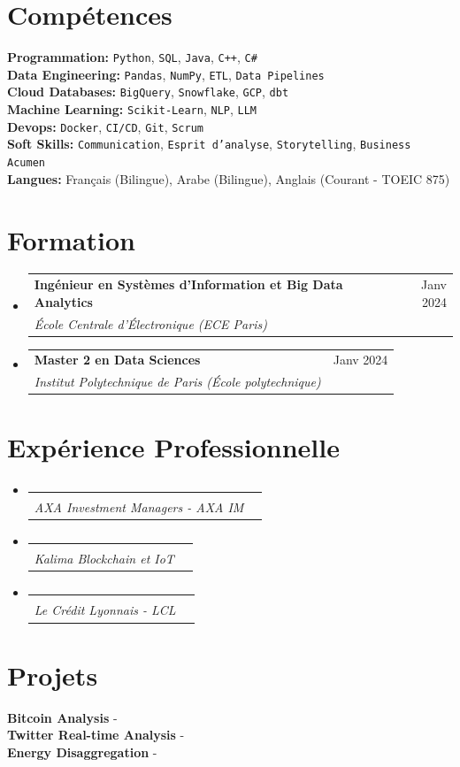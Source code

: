 \documentclass[11pt,a4paper]{article}
\makeatletter
\newcommand{\resumeSubheading}[4]{
  \vspace{2pt}\item
    \begin{tabular*}{\textwidth}[t]{l@{\extracolsep{\fill}}r}
      {\footnotesize\textbf{#1}} & {\footnotesize#2} \\
      {\footnotesize\textit{#3}} & {\footnotesize\textit{#4}} \\
    \end{tabular*}\vspace{2pt}
}
\newcommand{\resumeSubHeadingListStart}{\begin{itemize}[leftmargin=0in, label={}]}
\newcommand{\resumeSubHeadingListEnd}{\end{itemize}}
\newcommand{\resumeItemListStart}{\begin{itemize}[label={\textbullet}]}
\newcommand{\resumeItemListEnd}{\end{itemize}\vspace{0pt}}
\makeatother
\begin{document}
\vspace{10pt}
\section{Compétences}
\textbf{Programmation:} \texttt{Python}, \texttt{SQL}, \texttt{Java}, \texttt{C++}, \texttt{C#} \\
\textbf{Data Engineering:} \texttt{Pandas}, \texttt{NumPy}, \texttt{ETL}, \texttt{Data Pipelines} \\
\textbf{Cloud Databases:} \texttt{BigQuery}, \texttt{Snowflake}, \texttt{GCP}, \texttt{dbt} \\
\textbf{Machine Learning:} \texttt{Scikit-Learn}, \texttt{NLP}, \texttt{LLM} \\
\textbf{Devops:} \texttt{Docker}, \texttt{CI/CD}, \texttt{Git}, \texttt{Scrum} \\
\textbf{Soft Skills:} \texttt{Communication}, \texttt{Esprit d'analyse}, \texttt{Storytelling}, \texttt{Business Acumen} \\
\textbf{Langues:} Français (Bilingue), Arabe (Bilingue), Anglais (Courant - TOEIC 875) \\

\vspace{10pt}
\section{Formation}
\resumeSubHeadingListStart
\resumeSubheading
{Ingénieur en Systèmes d'Information et Big Data Analytics}{Janv 2024}
{École Centrale d'Électronique (ECE Paris)}{}

\resumeSubheading
{Master 2 en Data Sciences}{Janv 2024}
{Institut Polytechnique de Paris (École polytechnique)}{}

\resumeSubHeadingListEnd

\vspace{10pt}
\section{Expérience Professionnelle}
\resumeSubHeadingListStart
\resumeSubheading
{}{}
{AXA Investment Managers - AXA IM}{}

\resumeSubheading
{}{}
{Kalima Blockchain et IoT}{}

\resumeSubheading
{}{}
{Le Crédit Lyonnais - LCL}{}

\resumeSubHeadingListEnd

\vspace{10pt}
\section{Projets}
\resumeItemListStart
\textbf{Bitcoin Analysis} -  \\
\textbf{Twitter Real-time Analysis} -  \\
\textbf{Energy Disaggregation \@Capgemini} -  \\
\resumeItemListEnd
\end{document}
